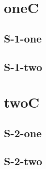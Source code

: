 \documentclass%
   [oneside]{memoir}
\begin{document}
\dominitoc
\tableofcontents*

\chapter[oneA][oneB]{oneC}
\minitoc
\lipsum[1]
\newpage
\lipsum[2]
\section{S-1-one}
\lipsum[3]
\section{S-1-two}
\lipsum[4]

\chapter[twoA][twoB]{twoC}
\minitoc
\lipsum[4]
\newpage
\lipsum[5]
\section{S-2-one}
\lipsum[6]
\section{S-2-two}
\lipsum[7]
\end{document}
